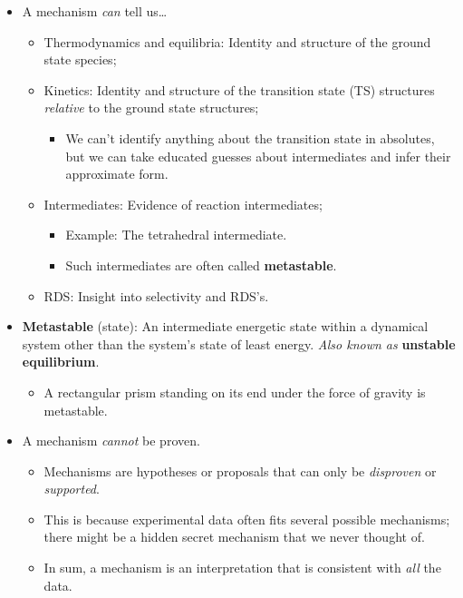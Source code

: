 \documentclass[../notes.tex]{subfiles}
\begin{document}
\begin{itemize}
    \item A mechanism \emph{can} tell us\dots
    \begin{itemize}
        \item Thermodynamics and equilibria: Identity and structure of the ground state species;
        \item Kinetics: Identity and structure of the transition state (TS) structures \emph{relative} to the ground state structures;
        \begin{itemize}
            \item We can't identify anything about the transition state in absolutes, but we can take educated guesses about intermediates and infer their approximate form.
        \end{itemize}
        \item Intermediates: Evidence of reaction intermediates;
        \begin{itemize}
            \item Example: The tetrahedral intermediate.
            \item Such intermediates are often called \textbf{metastable}.
        \end{itemize}
        \item RDS: Insight into selectivity and RDS's.
    \end{itemize}
    \item \textbf{Metastable} (state): An intermediate energetic state within a dynamical system other than the system's state of least energy. \emph{Also known as} \textbf{unstable equilibrium}.
    \begin{itemize}
        \item A rectangular prism standing on its end under the force of gravity is metastable.
    \end{itemize}
    \item A mechanism \emph{cannot} be proven.
    \begin{itemize}
        \item Mechanisms are hypotheses or proposals that can only be \emph{disproven} or \emph{supported}.
        \item This is because experimental data often fits several possible mechanisms; there might be a hidden secret mechanism that we never thought of.
        \item In sum, a mechanism is an interpretation that is consistent with \emph{all} the data.

\end{itemize}
\end{itemize}
\end{document}
